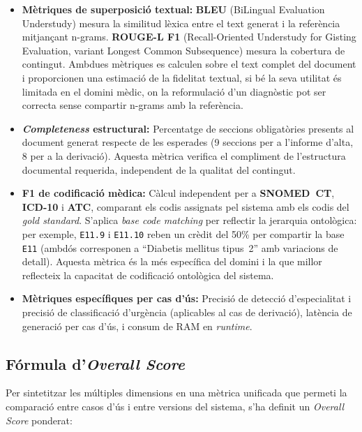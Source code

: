 \documentclass[CAT]{TFUOC}%
\begin{document}
\begin{itemize}
    \item \textbf{Mètriques de superposició textual:} \textbf{BLEU} (BiLingual Evaluation Understudy) mesura la similitud lèxica entre el text generat i la referència mitjançant n-grams. \textbf{ROUGE-L F1} (Recall-Oriented Understudy for Gisting Evaluation, variant Longest Common Subsequence) mesura la cobertura de contingut. Ambdues mètriques es calculen sobre el text complet del document i proporcionen una estimació de la fidelitat textual, si bé la seva utilitat és limitada en el domini mèdic, on la reformulació d'un diagnòstic pot ser correcta sense compartir n-grams amb la referència.

    \item \textbf{\textit{Completeness} estructural:} Percentatge de seccions obligatòries presents al document generat respecte de les esperades (9 seccions per a l'informe d'alta, 8 per a la derivació). Aquesta mètrica verifica el compliment de l'estructura documental requerida, independent de la qualitat del contingut.

    \item \textbf{F1 de codificació mèdica:} Càlcul independent per a \textbf{SNOMED~CT}, \textbf{ICD-10} i \textbf{ATC}, comparant els codis assignats pel sistema amb els codis del \textit{gold standard}. S'aplica \textit{base code matching} per reflectir la jerarquia ontològica: per exemple, \texttt{E11.9} i \texttt{E11.10} reben un crèdit del 50\% per compartir la base \texttt{E11} (ambdós corresponen a ``Diabetis mellitus tipus~2'' amb variacions de detall). Aquesta mètrica és la més específica del domini i la que millor reflecteix la capacitat de codificació ontològica del sistema.

    \item \textbf{Mètriques específiques per cas d'ús:} Precisió de detecció d'especialitat i precisió de classificació d'urgència (aplicables al cas de derivació), latència de generació per cas d'ús, i consum de RAM en \textit{runtime}.
\end{itemize}

\subsection{Fórmula d'\textit{Overall Score}}

Per sintetitzar les múltiples dimensions en una mètrica unificada que permeti la comparació entre casos d'ús i entre versions del sistema, s'ha definit un \textit{Overall Score} ponderat:
\end{document}
